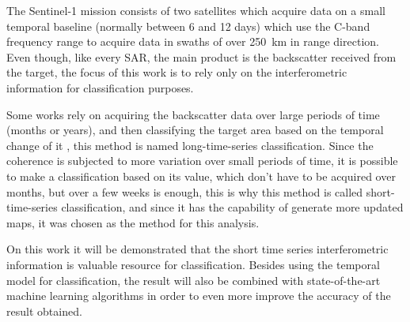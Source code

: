 The Sentinel-1 mission consists of two satellites which acquire data on a small temporal baseline (normally between 6 and 12 days) which use the C-band frequency range to acquire data in swaths of over 250 km in range direction. Even though, like every SAR, the main product is the backscatter received from the target, the focus of this work is to rely only on the interferometric information for classification purposes. 

Some works rely on acquiring the backscatter data over large periods of time (months or years), and then classifying the target area based on the temporal change of it \cite{long_time_series}, this method is named long-time-series classification. Since the coherence is subjected to more variation over small periods of time, it is possible to make a classification based on its value, which don't have to be acquired over months, but over a few weeks is enough, this is why this method is called short-time-series classification, and since it has the capability of generate more updated maps, it was chosen as the method for this analysis. 

On this work it will be demonstrated that the short time series interferometric information is valuable resource for classification. Besides using the temporal model for classification, the result will also be combined with state-of-the-art machine learning algorithms in order to even more improve the accuracy of the result obtained. 

